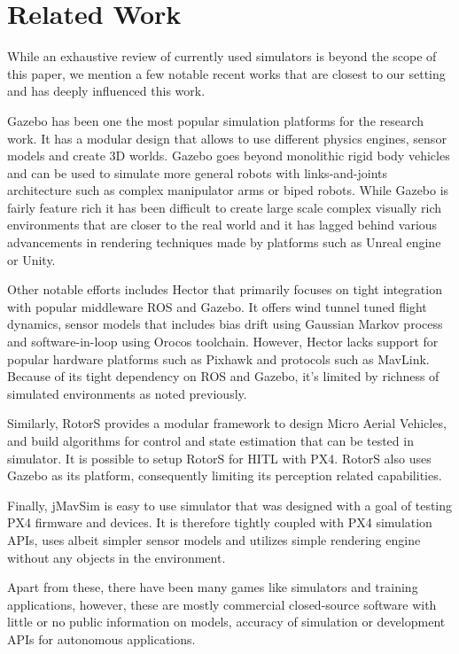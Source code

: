 \documentclass[graybox]{svmult}
\begin{document}
	\section{Related Work}
	While an exhaustive review of currently used simulators is beyond the scope of this paper, we mention a few notable recent works that are closest to our setting and has deeply influenced this work.
	
	Gazebo \cite{koenig2004design} has been one the most popular simulation platforms for the research work. It has a modular design that allows to use different physics engines, sensor models and create 3D worlds. Gazebo goes beyond monolithic rigid body vehicles and can be used to simulate more general robots with links-and-joints architecture such as complex manipulator arms or biped robots. While Gazebo is fairly feature rich it has been difficult to create large scale complex visually rich environments that are closer to the real world and it has lagged behind various advancements in rendering techniques made by platforms such as Unreal engine or Unity.
	
	Other notable efforts includes Hector \cite{meyer2012comprehensive} that primarily focuses on tight integration with popular middleware ROS and Gazebo. It offers wind tunnel tuned flight dynamics, sensor models that includes bias drift using Gaussian Markov process and software-in-loop using Orocos toolchain. However, Hector lacks support for popular hardware platforms such as Pixhawk and protocols such as MavLink. Because of its tight dependency on ROS and Gazebo, it's limited by richness of simulated environments as noted previously.
	
	Similarly, RotorS \cite{furrer2016rotors} provides a modular framework to design Micro Aerial Vehicles, and build algorithms for control and state estimation that can be tested in simulator. It is possible to setup RotorS for HITL with PX4. RotorS also uses Gazebo as its platform, consequently limiting its perception related capabilities. 
	
	Finally, jMavSim \cite{jmavsim} is easy to use simulator that was designed with a goal of testing PX4 firmware and devices. It is therefore tightly coupled with PX4 simulation APIs, uses albeit simpler sensor models and utilizes simple rendering engine without any objects in the environment. 
	
	Apart from these, there have been many games like simulators and training applications, however, these are mostly commercial closed-source software with little or no public information on models, accuracy of simulation or development APIs for autonomous applications.
	
\end{document}
